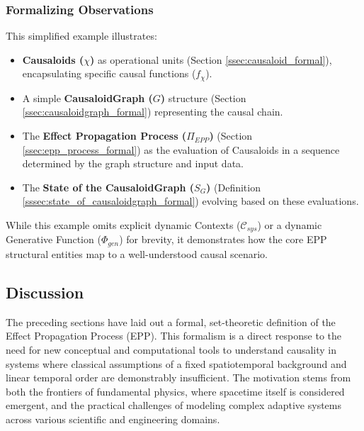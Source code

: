 \subsubsection{Formalizing Observations}
\label{ssec:example_observations_connection}
This simplified example illustrates:
\begin{itemize}
    \item \textbf{Causaloids (\(\chi\))} as operational units (Section \ref{ssec:causaloid_formal}), encapsulating specific causal functions (\(f_\chi\)).
    \item A simple \textbf{CausaloidGraph (\(G\))} structure (Section \ref{ssec:causaloidgraph_formal}) representing the causal chain.
    \item The \textbf{Effect Propagation Process (\(\Pi_{EPP}\))} (Section \ref{ssec:epp_process_formal}) as the evaluation of Causaloids in a sequence determined by the graph structure and input data.
    \item The \textbf{State of the CausaloidGraph (\(S_G\))} (Definition \ref{sssec:state_of_causaloidgraph_formal}) evolving based on these evaluations.
\end{itemize}
While this example omits explicit dynamic Contexts (\(\mathcal{C}_{sys}\)) or a dynamic Generative Function (\(\Phi_{gen}\)) for brevity, it demonstrates how the core EPP structural entities map to a well-understood causal scenario.


\subsection[Discussion]{Discussion}
\label{sec:formalization_example_discussion}

The preceding sections have laid out a formal, set-theoretic definition of the Effect Propagation Process (EPP). This formalism is a direct response to the need for new conceptual and computational tools to understand causality in systems where classical assumptions of a fixed spatiotemporal background and linear temporal order are demonstrably insufficient. The motivation stems from both the frontiers of fundamental physics, where spacetime itself is considered emergent, and the practical challenges of modeling complex adaptive systems across various scientific and engineering domains.

